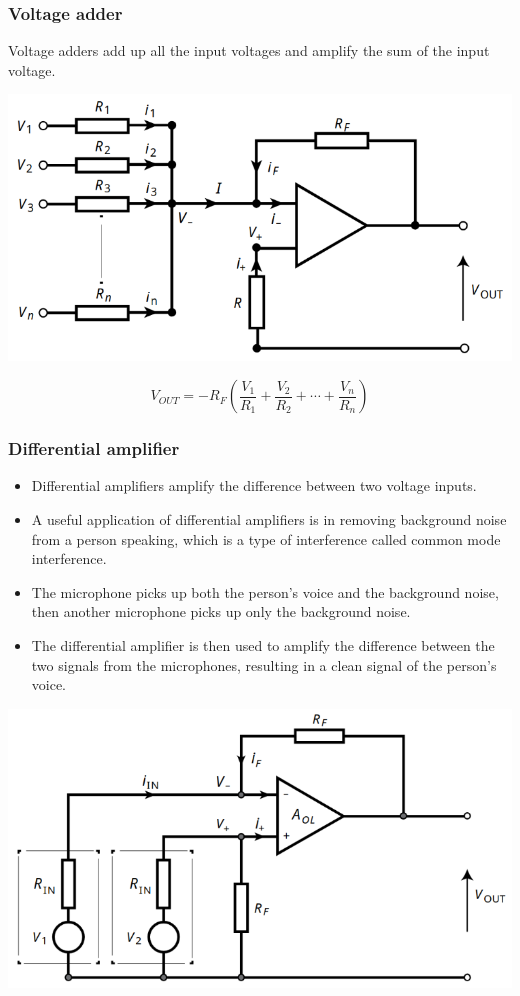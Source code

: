 \documentclass[11pt]{article}
\begin{document}
\subsubsection{Voltage adder}
\label{sec:org2e9c2d6}
Voltage adders add up all the input voltages and amplify the sum of the input voltage.
\begin{center}
\includegraphics[width=.9\linewidth]{./images/voltage-adder.png}
\end{center}
\[V_{OUT} = -R_F \left(\frac{V_1}{R_1} + \frac{V_2}{R_2} + \cdots + \frac{V_n}{R_n} \right)\]

 \newpage
\subsubsection{Differential amplifier}
\label{sec:org93b63c8}
\begin{itemize}
\item Differential amplifiers amplify the difference between two voltage inputs.
\item A useful application of differential amplifiers is in removing background noise from a person speaking, which is a type of interference called common mode interference.
\item The microphone picks up both the person's voice and the background noise, then another microphone picks up only the background noise.
\item The differential amplifier is then used to amplify the difference between the two signals from the microphones, resulting in a clean signal of the person's voice.
\end{itemize}

\begin{center}
\includegraphics[scale=0.8]{./images/differential-amplifier.png}
\end{center}
\end{document}
